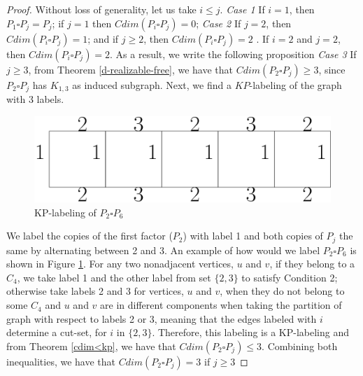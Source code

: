 \documentclass[12pt,a4paper,titlepage,openany]{report}
\begin{document}
\begin{proof}
 Without loss of generality, let us take $i\leq j$.\newline
\textit{Case 1} If $i=1$, then $P_1\square P_j=P_j$; if $j=1$ then $Cdim(P_i\square P_j)=0$;
\textit{Case 2} If $j=2$, then $Cdim(P_i\square P_j)=1$; and if $j\geq 2$, then $Cdim(P_i\square P_j)=2$
 .\newline 
If $i=2$ and $j=2$, then $Cdim(P_i\square P_j)=2$.
As a result, we write the following proposition
\newline
\textit{Case 3} If $j\geq 3$, from Theorem \ref{d-realizable-free}, we have that $Cdim(P_2\square P_j)\geq 3$, since $P_2 \square P_j$ has $K_{1,3}$ as induced subgraph.\newline
Next, we find a $KP$-labeling of the graph with 3 labels.
\begin{figure}[h]
\begin{center}
\includegraphics[width=0.6\linewidth]{figures/p_2sqp_j.png}
\end{center}
\caption{KP-labeling of $P_2\square P_6$}\label{fig:P_2sqP_6}
\end{figure}\newline
We label the copies of the first factor ($P_2$) with label 1 and both copies of $P_j$ the same by alternating between 2 and 3.
An example of how would we label $P_2\square P_6$ is shown in Figure \ref{fig:P_2sqP_6}.\newline
For any two nonadjacent vertices, $u$ and $v$, if they belong to a $C_4$, we take label 1 and the other label from set $\{2,3\}$ to satisfy Condition 2; otherwise take labels 2 and 3 for vertices, $u$ and $v$, when they do not belong to some $C_4$ and $u$ and $v$ are in different components when taking the partition of graph with respect to labels 2 or 3, meaning that the edges labeled with $i$ determine a cut-set, for $i$ in $\{2,3\}$.\newline
Therefore, this labeling is a KP-labeling and from Theorem \ref{cdim<kp}, we have that $Cdim(P_2\square P_j)\leq 3$.\newline
Combining both inequalities, we have that $Cdim(P_2\square P_j)=3$ if $j\geq 3$




\end{proof}
\end{document}
